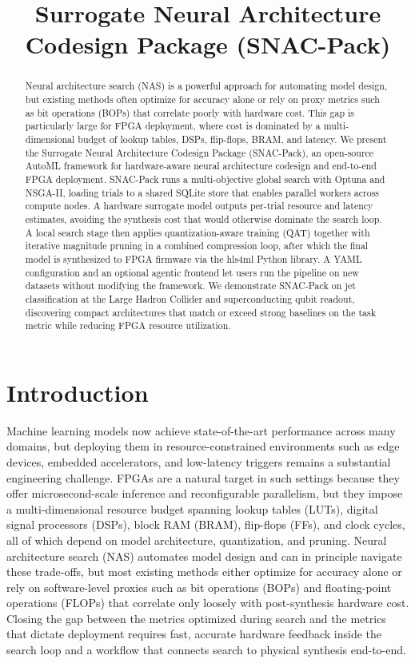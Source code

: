 \documentclass[11pt]{article}
\title{Surrogate Neural Architecture Codesign Package (SNAC-Pack)}
\author[1]{\nameemail{Jason Weitz}{jdweitz@ucsd.edu}}
\author[2,1]{\nameemail{Dmitri Demler}{ddemler@ethz.ch}}
\author[3]{\nameemail{Benjamin Hawks}{bhawks@fnal.gov}}
\author[4]{\nameemail{Aaron Wang}{aaronw5@uic.edu}}
\author[3]{\nameemail{Nhan Tran}{ntran@fnal.gov}}
\author[1]{\nameemail{Javier Duarte}{jduarte@ucsd.edu}}
\affil[1]{University of California San Diego}
\affil[2]{ETH Zurich}
\affil[3]{Fermi National Accelerator Laboratory }
\affil[4]{University of Illinois Chicago}
\begin{document}
\maketitle

\begin{abstract}
Neural architecture search (NAS) is a powerful approach for automating model design, but existing methods often optimize for accuracy alone or rely on proxy metrics such as bit operations (BOPs) that correlate poorly with hardware cost.
This gap is particularly large for FPGA deployment, where cost is dominated by a multi-dimensional budget of lookup tables, DSPs, flip-flops, BRAM, and latency.
We present the Surrogate Neural Architecture Codesign Package (SNAC-Pack), an open-source AutoML framework for hardware-aware neural architecture codesign and end-to-end FPGA deployment.
SNAC-Pack runs a multi-objective global search with Optuna and NSGA-II, loading trials to a shared SQLite store that enables parallel workers across compute nodes.
A hardware surrogate model outputs per-trial resource and latency estimates, avoiding the synthesis cost that would otherwise dominate the search loop.
A local search stage then applies quantization-aware training (QAT) together with iterative magnitude pruning in a combined compression loop, after which the final model is synthesized to FPGA firmware via the hls4ml Python library.
A YAML configuration and an optional agentic frontend let users run the pipeline on new datasets without modifying the framework.
We demonstrate SNAC-Pack on jet classification at the Large Hadron Collider and superconducting qubit readout, discovering compact architectures that match or exceed strong baselines on the task metric while reducing FPGA resource utilization.
\end{abstract}

\section{Introduction}
\label{sec:intro}

Machine learning models now achieve state-of-the-art performance across many domains, but deploying them in resource-constrained environments such as edge devices, embedded accelerators, and low-latency triggers remains a substantial engineering challenge.
FPGAs are a natural target in such settings because they offer microsecond-scale inference and reconfigurable parallelism, but they impose a multi-dimensional resource budget spanning lookup tables (LUTs), digital signal processors (DSPs), block RAM (BRAM), flip-flops (FFs), and clock cycles, all of which depend on model architecture, quantization, and pruning.
Neural architecture search (NAS) automates model design and can in principle navigate these trade-offs, but most existing methods either optimize for accuracy alone or rely on software-level proxies such as bit operations (BOPs) and floating-point operations (FLOPs) that correlate only loosely with post-synthesis hardware cost.
Closing the gap between the metrics optimized during search and the metrics that dictate deployment requires fast, accurate hardware feedback inside the search loop and a workflow that connects search to physical synthesis end-to-end.
\end{document}
